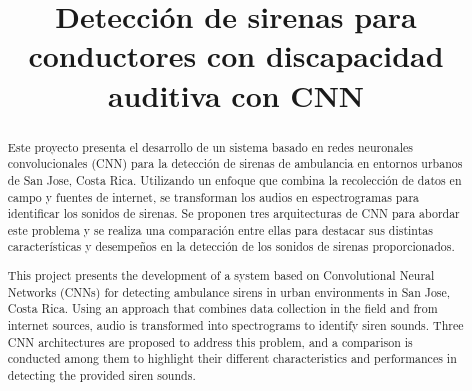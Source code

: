 \documentclass[conference, spanish, english]{IEEEtran}
\begin{document}
\title{Detección de sirenas para conductores con discapacidad auditiva con CNN
}

\author{
}

\maketitle
\thispagestyle{plain}
\pagestyle{plain}


\setcounter{page}{1} %
\begin{abstract}

Este proyecto presenta el desarrollo de un sistema basado en redes neuronales convolucionales (CNN) para la detección de sirenas de ambulancia en entornos urbanos de San Jose, Costa Rica. Utilizando un enfoque que combina la recolección de datos en campo y fuentes de internet, se transforman los audios en espectrogramas para identificar los sonidos de sirenas. Se proponen tres arquitecturas de CNN para abordar este problema y se realiza una comparación entre ellas para destacar sus distintas características y desempeños en la detección de los sonidos de sirenas proporcionados.\\
\end{abstract}

\begin{abstract}
This project presents the development of a system based on Convolutional Neural Networks (CNNs) for detecting ambulance sirens in urban environments in San Jose, Costa Rica. Using an approach that combines data collection in the field and from internet sources, audio is transformed into spectrograms to identify siren sounds. Three CNN architectures are proposed to address this problem, and a comparison is conducted among them to highlight their different characteristics and performances in detecting the provided siren sounds.
\end{abstract}
\end{document}

